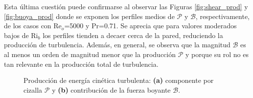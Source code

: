 Esta última cuestión puede confirmarse al observar las Figuras \ref{fig:shear_prod} y \ref{fig:buoya_prod} donde se exponen los perfiles medios de $\mathcal{P}$ y $\mathcal{B}$, respectivamente, de los casos con Re$_o$=5000 y Pr=0.71. Se aprecia que para valores moderados bajos de Ri$_b$ los perfiles tienden a decaer cerca de la pared, reduciendo la producción de turbulencia. Además, en general, se observa que la magnitud $\mathcal{B}$ es al menos un orden de magnitud menor que la producción $\mathcal{P}$ y porque su rol no es tan relevante en la producción total de turbulencia.
\begin{figure}[H]
  \centering
  \caption{Producción de energía cinética turbulenta: \textbf{(a)} componente por cizalla $\mathcal{P}$ y \textbf{(b)} contribución de la fuerza boyante $\mathcal{B}$.}
  \label{fig:budgets_prod}
\end{figure}

